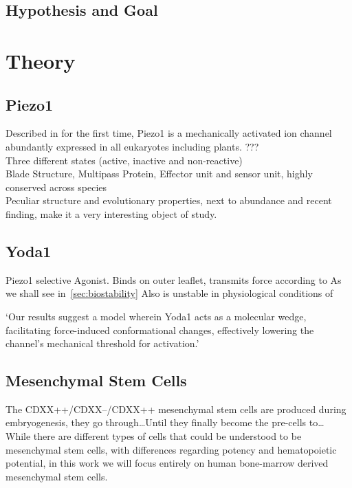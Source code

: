 \subsection{Hypothesis and Goal}


\section{Theory}

\subsection{Piezo1}
Described in  for the first time, Piezo1 is a  mechanically activated ion channel abundantly expressed in all eukaryotes including plants. ???\cite{Coste55} \\
Three different states (active, inactive and non-reactive)\\
Blade Structure, Multipass Protein, Effector unit and sensor unit, highly conserved across species\\
Peculiar structure and evolutionary properties, next to abundance and recent finding, make it a very interesting object of study. 

\subsection{Yoda1}
Piezo1 selective Agonist. Binds on outer leaflet, transmits force according to
As we shall see in~\vref{sec:biostability} Also is unstable in physiological conditions of 

`Our results suggest a model wherein Yoda1 acts as a molecular wedge, facilitating force-induced conformational changes, effectively lowering the channel's mechanical threshold for activation.'\cite{BotelloSmith.2019} 

\subsection{Mesenchymal Stem Cells}
The CDXX++/CDXX--/CDXX++ mesenchymal stem cells are produced during embryogenesis, they go through\dots Until they finally become the pre-cells to\dots 
While there are different types of cells that could be understood to be mesenchymal stem cells, with differences regarding potency and hematopoietic potential, in this work we will focus entirely on human bone-marrow derived mesenchymal stem cells. 

